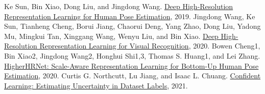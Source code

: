 \documentclass[a4j]{ujarticle}
\begin{document}
    \begin{thebibliography}{9} 
         Ke Sun, Bin Xiao, Dong Liu, and Jingdong Wang. \href{https://arxiv.org/pdf/1902.09212.pdf}{Deep High-Resolution Representation Learning for Human Pose Estimation}, 2019.
         Jingdong Wang, Ke Sun, Tianheng Cheng, Borui Jiang, Chaorui Deng, Yang Zhao, Dong Liu, Yadong Mu, Mingkui Tan, Xinggang Wang, Wenyu Liu, and Bin Xiao. \href{https://arxiv.org/pdf/1908.07919.pdf}{Deep High-Resolution Representation Learning for Visual Recognition}, 2020.
         Bowen Cheng1, Bin Xiao2, Jingdong Wang2, Honghui Shi1,3, Thomas S. Huang1, and Lei Zhang. \href{https://arxiv.org/pdf/1908.10357.pdf}{HigherHRNet: Scale-Aware Representation Learning for Bottom-Up Human Pose Estimation}, 2020.
         Curtis G. Northcutt, Lu Jiang, and Isaac L. Chuang. \href{https://arxiv.org/pdf/1911.00068.pdf}{Confident Learning: Estimating Uncertainty in Dataset Labels}, 2021.
    \end{thebibliography}
\end{document}
